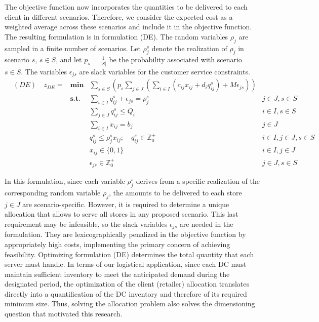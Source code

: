 \documentclass[11pt]{article}
\begin{document}
The objective function now incorporates the quantities to be delivered to each client in different scenarios. Therefore, we consider the expected cost as a weighted average across these scenarios and include it in the objective function. 
The resulting formulation is in formulation (DE). The random variables $\rho_j$ are sampled in a finite number of scenarios. Let $\rho^s_j$ denote the realization of $\rho_j$ in scenario $s$, $s \in S$, and let $p_s = \frac{1}{|S|}$ be the probability associated with scenario $s \in S$. The variables $\epsilon_{js}$ are slack variables for the customer service constraints.
\begin{align}
	&(DE)\quad z_{DE} = & \textbf{min} &\sum_{s \in S} \left( p_s \sum_{j \in J} \left( \sum_{i \in I} ( c_{ij}x_{ij} + d_i q_{ij}^s) + M \epsilon_{js} \right) \right) \label{DEobj}\\
	& &  \textbf{s.t.}
	& \sum_{i \in I} q_{ij}^s + \epsilon_{js} = \rho_j^s & j \in J, s \in S \label{DErequest}\\
	& &  & \sum_{j \in J}q_{ij}^s \leq Q_i & i \in I, s \in S \label{DEcapacity}\\ 
	& &  & \sum_{i \in I} x_{ij} = b_j & j \in J  \label{DEnumserv}\\
	& &  & q_{ij}^s \leq \rho_j^s x_{ij}; \quad q_{ij}^s \in \mathbb{Z}^+_0 & i \in I, j \in J, s \in S \label{DEcontin}\\
	& &  & x_{ij} \in \{0,1\} & i\in I, j \in J \label{DEx}\\
	& &  & \epsilon_{js} \in \mathbb{Z}^+_0 & j \in J, s \in S \label{DEeps}
\end{align}

In this formulation, since each variable $\rho_j^s$ derives from a specific realization of the corresponding random variable $\rho_j$, the amounts to be delivered to each store $j \in J$ are scenario-specific. However, it is required to determine a unique allocation that allows to serve all stores in any proposed scenario. This last requirement may be infeasible, so the slack variables $\epsilon_{js}$ are needed in the formulation. They are lexicographically penalized in the objective function by appropriately high costs, implementing the primary concern of achieving feasibility.
Optimizing formulation (DE) determines the total quantity that each server must handle. In terms of our logistical application, since each DC must maintain sufficient inventory to meet the anticipated demand during the designated period, the optimization of the client (retailer) allocation translates directly into a quantification of the DC inventory and therefore of its required minimum size. Thus, solving the allocation problem also solves the dimensioning question that motivated this research.
\end{document}
